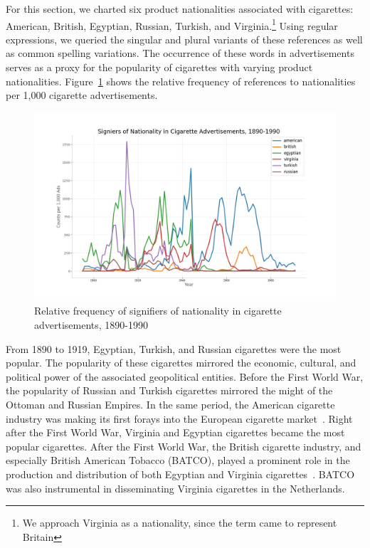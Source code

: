 \documentclass[USenglish]{article}
\begin{document}
For this section, we charted six product nationalities associated with cigarettes: American, British, Egyptian, Russian, Turkish, and Virginia.\footnote{We approach Virginia as a nationality, since the term came to represent Britain} Using regular expressions, we queried the singular and plural variants of these references as well as common spelling variations. The occurrence of these words in advertisements serves as a proxy for the popularity of cigarettes with varying product nationalities. Figure~\ref{fig:cig_nationality} shows the relative frequency of references to nationalities per 1,000 cigarette advertisements. 

\begin{figure}%
  \centering
  \includegraphics[width=.9\textwidth]{figures/cigarette_nationality}%
  \caption{Relative frequency of signifiers of nationality in cigarette advertisements, 1890-1990}%
  \label{fig:cig_nationality}%
\end{figure}
 

From 1890 to 1919, Egyptian, Turkish, and Russian cigarettes were the most popular. The popularity of these cigarettes mirrored the economic, cultural, and political power of the associated geopolitical entities. Before the First World War, the popularity of Russian and Turkish cigarettes mirrored the might of the Ottoman and Russian Empires. In the same period, the American cigarette industry was making its first forays into the European cigarette market~\cite{brandt_cigarette_2009}.
%
Right after the First World War, Virginia and Egyptian cigarettes became the most popular cigarettes. After the First World War, the British cigarette industry, and especially British American Tobacco (BATCO), played a prominent role in the production and distribution of both Egyptian and Virginia cigarettes~\cite[27-8]{shechter_smoking_2006}. BATCO was also instrumental in disseminating Virginia cigarettes in the Netherlands.
\end{document}
